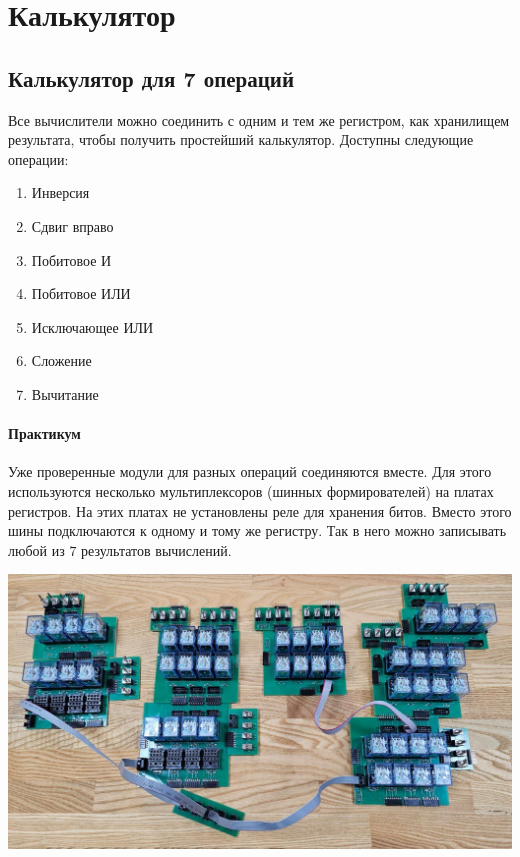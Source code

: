 \chapter{Калькулятор}


\section{Калькулятор для 7 операций}

Все вычислители можно соединить с одним и тем же регистром, как хранилищем результата, чтобы получить простейший
калькулятор. Доступны следующие операции:
\begin{enumerate}
    \item Инверсия
    \item Сдвиг вправо
    \item Побитовое И
    \item Побитовое ИЛИ
    \item Исключающее ИЛИ
    \item Сложение
    \item Вычитание
\end{enumerate}

\subsubsection{Практикум}

Уже проверенные модули для разных операций соединяются вместе.
Для этого используются несколько мультиплексоров (шинных формирователей)
на платах регистров. На этих платах не установлены реле для хранения
битов. Вместо этого шины подключаются к одному и тому же регистру.
Так в него можно записывать любой из $7$ результатов вычислений.

\includegraphics[width=\columnwidth]{photo/calculator.jpg}

